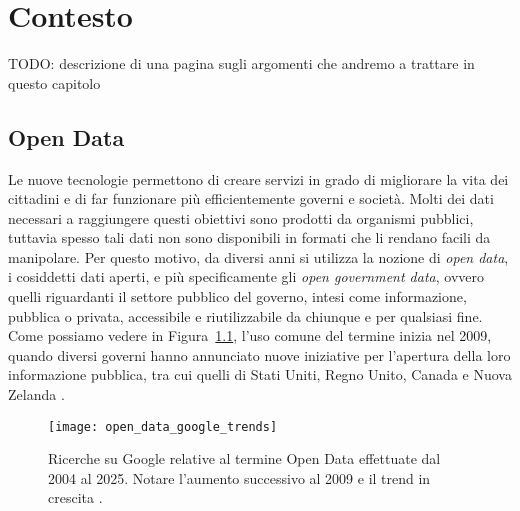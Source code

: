 \clearpage{\pagestyle{empty}\cleardoublepage}
\chapter{Contesto}
\lhead[\fancyplain{}{\bfseries\thepage}]{\fancyplain{}{\bfseries\rightmark}}

TODO: descrizione di una pagina sugli argomenti che andremo a trattare in questo capitolo \newpage

\section{Open Data} %
Le nuove tecnologie permettono di creare servizi in grado di migliorare la vita dei cittadini e di far funzionare più efficientemente governi e società. Molti dei dati necessari a raggiungere questi obiettivi sono prodotti da organismi pubblici, tuttavia spesso tali dati non sono disponibili in formati che li rendano facili da manipolare. Per questo motivo, da diversi anni si utilizza la nozione di \textit{open data}, i cosiddetti dati aperti, e più specificamente gli \textit{open government data}, ovvero quelli riguardanti il settore pubblico del governo, intesi come informazione, pubblica o privata, accessibile e riutilizzabile da chiunque e per qualsiasi fine. Come possiamo vedere in Figura~\ref{fig:open_data_google_trends}, l'uso comune del termine inizia nel 2009, quando diversi governi hanno annunciato nuove iniziative per l'apertura della loro informazione pubblica, tra cui quelli di Stati Uniti, Regno Unito, Canada e Nuova Zelanda \cite{OpenDataHandbook_Introduction}.

\begin{figure}[H]
    \centering
    \texttt{[image: open\_data\_google\_trends]}
    \caption[Open Data su Google Trends]{Ricerche su Google relative al termine Open Data effettuate dal 2004 al 2025. Notare l'aumento successivo al 2009 e il trend in crescita \cite{Google_Trends}.}
    \label{fig:open_data_google_trends}
\end{figure}

